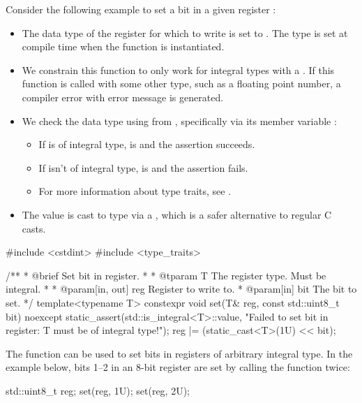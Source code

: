 Consider the following example to set a bit  in a given register :
\begin{itemize}
  \item The data type of the register for which to write is set to . The type is set at
    compile time when the function is instantiated.
  \item We constrain this function to only work for integral types with a . If
    this function is called with some other type, such as a floating point number, a compiler
    error with error message  is
    generated.
  \item We check the data type using  from ,
    specifically via its member variable :
  \begin{itemize}
    \item If  is of integral type,  is  and the
      assertion succeeds.
    \item If  isn't of integral type,  is  and
      the assertion fails.
    \item For more information about type traits, see .
  \end{itemize}
  \item The value  is cast to type  via a , which is a safer
    alternative to regular C casts.
\end{itemize}

\begin{cppcode}
#include <cstdint>
#include <type_traits>

/**
 * @brief Set bit in register.
 *
 * @tparam T The register type. Must be integral.
 *
 * @param[in, out] reg Register to write to.
 * @param[in] bit The bit to set.
 */
template<typename T>
constexpr void set(T& reg, const std::uint8_t bit) noexcept
{
    static_assert(std::is_integral<T>::value,
        "Failed to set bit in register: T must be of integral type!");
    reg |= (static_cast<T>(1U) << bit);
}
\end{cppcode}

\noindent The function can be used to set bits in registers of arbitrary integral type. In the
example below, bits 1--2 in an 8-bit register are set by calling the  function
twice:

\begin{cppcode}
std::uint8_t reg{};
set(reg, 1U);
set(reg, 2U);
\end{cppcode}

